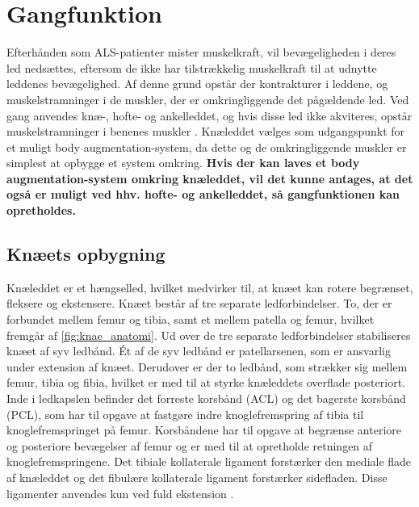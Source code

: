\section{Gangfunktion}
Efterhånden som ALS-patienter mister muskelkraft, vil bevægeligheden i deres led nedsættes, eftersom de ikke har tilstrækkelig muskelkraft til at udnytte leddenes bevægelighed. Af denne grund opstår der kontrakturer i leddene, og muskelstramninger i de muskler, der er omkringliggende det pågældende led. Ved gang anvendes knæ-, hofte- og ankelleddet, og hvis disse led ikke akviteres, opstår muskelstramninger i benenes muskler \citep{instforms2008}. Knæleddet vælges som udgangspunkt for et muligt body augmentation-system, da dette og de omkringliggende muskler er simplest at opbygge et system omkring. \textbf{Hvis der kan laves et body augmentation-system omkring knæleddet, vil det kunne antages, at det også er muligt ved hhv. hofte- og ankelleddet, så gangfunktionen kan opretholdes.}

\subsection{Knæets opbygning}
Knæleddet er et hængselled, hvilket medvirker til, at knæet kan rotere begrænset, fleksere og ekstensere. Knæet består af tre separate ledforbindelser. To, der er forbundet mellem femur og tibia, samt et mellem patella og femur, hvilket fremgår af \autoref{fig:knae_anatomi}. Ud over de tre separate ledforbindelser stabiliseres knæet af syv ledbånd. Ét af de syv ledbånd er patellarsenen, som er ansvarlig under extension af knæet. Derudover er der to ledbånd, som strækker sig mellem femur, tibia og fibia, hvilket er med til at styrke knæleddets overflade posteriort. Inde i ledkapslen befinder det forreste korsbånd (ACL) og det bagerste korsbånd (PCL), som har til opgave at fastgøre indre knoglefremspring af tibia til knoglefremspringet på femur. Korsbåndene har til opgave at begrænse anteriore og posteriore bevægelser af femur og er med til at opretholde retningen af knoglefremspringene. Det tibiale kollaterale ligament forstærker den mediale flade af knæleddet og det fibulære kollaterale ligament forstærker sidefladen. Disse ligamenter anvendes kun ved fuld ekstension \citep{martini2012}.

